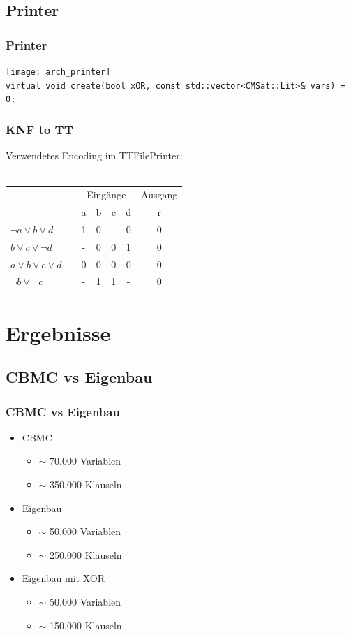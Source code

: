 \documentclass{beamer}
\begin{document}
\subsection{Printer}
  \begin{frame}
    \frametitle{Printer}
    \texttt{[image: arch\_printer]}\\
    \texttt{virtual void create(bool xOR, const std::vector{\textless}CMSat::Lit{\textgreater}\& vars) = 0;}
  \end{frame}
  \begin{frame}
    \frametitle{KNF to TT}
    Verwendetes Encoding im TTFilePrinter:\\
    ~\\
    \begin{tabular}{lp{2cm}|cccc|c|}
       &  & \multicolumn{4}{c|}{Eingänge} & Ausgang\\
       &  & a & b & c & d & r \\
      \cline{3-7}
      $ \neg a \vee b \vee d $   &  & 1 & 0 & - & 0 & 0 \\
      $ b \vee c \vee \neg d $   &  & - & 0 & 0 & 1 & 0 \\
      $ a \vee b \vee c \vee d $ &  & 0 & 0 & 0 & 0 & 0 \\
      $ \neg b \vee \neg c $     &  & - & 1 & 1 & - & 0
    \end{tabular}
  \end{frame}
\section{Ergebnisse}
\subsection{CBMC vs Eigenbau}
  \begin{frame}
    \frametitle{CBMC vs Eigenbau}
    \begin{itemize}
      \item CBMC
      \begin{itemize}
        \item $ \sim $ 70.000 Variablen
        \item $ \sim $ 350.000 Klauseln
      \end{itemize}
      \item Eigenbau
      \begin{itemize}
        \item $ \sim $ 50.000 Variablen
        \item $ \sim $ 250.000 Klauseln
      \end{itemize}
      \item Eigenbau mit XOR
      \begin{itemize}
        \item $ \sim $ 50.000 Variablen
        \item $ \sim $ 150.000 Klauseln
      \end{itemize}
    \end{itemize}
  \end{frame}
\end{document}
